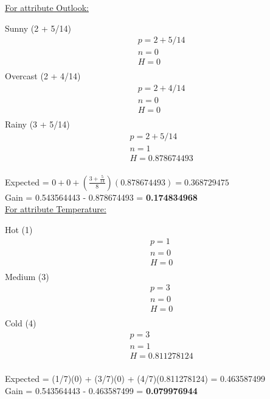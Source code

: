 \documentclass[8pt, fullpage,letterpaper]{article}
\begin{document}
\begin{enumerate}
\begin{enumerate}
\begin{enumerate}
\begin{enumerate}
\begin{itemize}
						\underline {For attribute Outlook:} 
							\vspace{-5pt}
							\begin{multicols}{3}
								Sunny (2 + 5/14)
			 						\begin{align*}
									    	& p = 2 + 5/14\\
										& n = 0 \\
									    	& H = 0\\
								      \end{align*}
								Overcast (2 + 4/14)
			 						\begin{align*}
									    	& p = 2 + 4/14\\
										& n = 0 \\
									    	& H = 0\\
								      \end{align*}
								Rainy (3 + 5/14)
			 						\begin{align*}
									    	& p = 2 + 5/14\\
										& n = 1 \\
									    	& H = 0.878674493\\
								      \end{align*}
							\end{multicols}
							\vspace{-20pt}
							Expected = $0+0+(\frac{3 + \frac{5}{14}}{8})(0.878674493) = 0.368729475$\\
							Gain = 0.543564443 - 0.878674493 = {\bf 0.174834968}\\

						\underline {For attribute Temperature:} 
							\vspace{-5pt}
							\begin{multicols}{3}
								Hot (1)
			 						\begin{align*}
									    	& p = 1\\
										& n = 0 \\
									    	& H = 0\\
								      \end{align*}
								Medium (3)
			 						\begin{align*}
									    	& p = 3\\
										& n = 0 \\
									    	& H = 0\\
								      \end{align*}
								Cold (4)
			 						\begin{align*}
									    	& p = 3\\
										& n = 1 \\
									    	& H = 0.811278124\\
								      \end{align*}
							\end{multicols}
							\vspace{-20pt}
							Expected = (1/7)(0) + (3/7)(0) + (4/7)(0.811278124) = 0.463587499\\
							Gain = 0.543564443 - 0.463587499 = {\bf 0.079976944}\\


\end{itemize}
\end{enumerate}
\end{enumerate}
\end{enumerate}
\end{enumerate}
\end{document}
